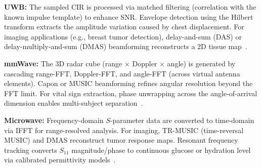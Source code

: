 \documentclass[journal,twoside]{IEEEtran}
\begin{document}
\textbf{UWB:} The sampled CIR is processed via matched filtering (correlation with the known impulse template) to enhance SNR. Envelope detection using the Hilbert transform extracts the amplitude variation caused by chest displacement. For imaging applications (e.g., breast tumor detection), delay-and-sum (DAS) or delay-multiply-and-sum (DMAS) beamforming reconstructs a 2D tissue map~\cite{ref_uwb_breast2024}.

\textbf{mmWave:} The 3D radar cube (range $\times$ Doppler $\times$ angle) is generated by cascading range-FFT, Doppler-FFT, and angle-FFT (across virtual antenna elements). Capon or MUSIC beamforming refines angular resolution beyond the FFT limit. For vital sign extraction, phase unwrapping across the angle-of-arrival dimension enables multi-subject separation~\cite{ref_mmwave_vital2025, ref_multipoint_mimo2024}.

\textbf{Microwave:} Frequency-domain $S$-parameter data are converted to time-domain via IFFT for range-resolved analysis. For imaging, TR-MUSIC (time-reversal MUSIC) and DMAS reconstruct tumor response maps. Resonant frequency tracking converts $S_{11}$ magnitude/phase to continuous glucose or hydration level via calibrated permittivity models~\cite{ref_noninvasive_glucose2025}.
\end{document}
